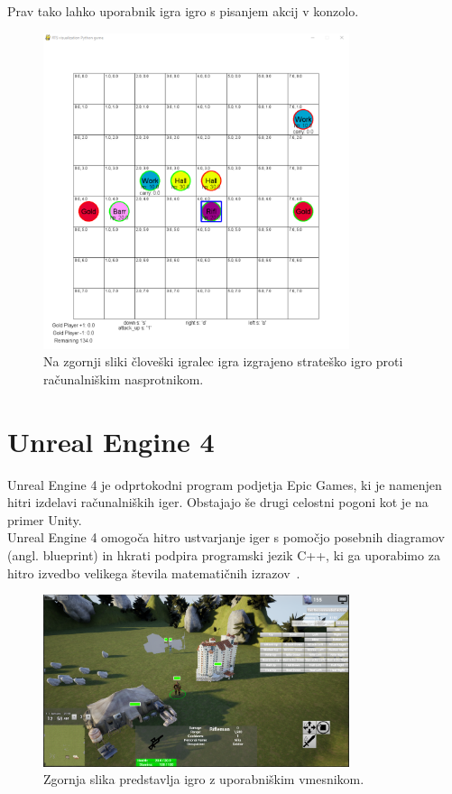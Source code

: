 \documentclass[a4paper, 12pt]{book}
\begin{document}
Prav tako lahko uporabnik igra igro s pisanjem akcij v konzolo.

\begin{figure}[h]
	\begin{center}
		\includegraphics[width=0.8\textwidth]{visualization_pygame.pdf}
	\end{center}
	\caption{Na zgornji sliki človeški igralec igra izgrajeno strateško igro proti računalniškim nasprotnikom.}
	\label{visualization_pygame}
\end{figure}

\section{Unreal Engine 4}
\label{UnrealEngine}

Unreal Engine 4 je odprtokodni program podjetja Epic Games, ki je namenjen hitri izdelavi računalniških iger. Obstajajo še drugi celostni pogoni kot je na primer Unity.\\
Unreal Engine 4 omogoča hitro ustvarjanje iger s pomočjo posebnih diagramov (angl. blueprint) in hkrati podpira programski jezik C++, ki ga uporabimo za hitro izvedbo velikega števila matematičnih izrazov~\cite{diploma2}.

\begin{figure}[h]
	\begin{center}
		\includegraphics[width=0.8\textwidth]{ue4-widget.pdf}
	\end{center}
	\caption{Zgornja slika predstavlja igro z uporabniškim vmesnikom.}
	\label{ue4-game}
\end{figure}
\end{document}
